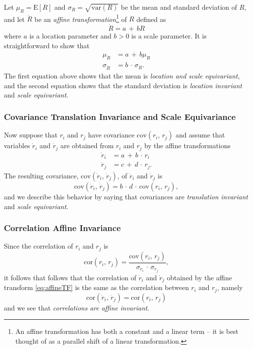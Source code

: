 \documentclass[graybox,envcountchap,sectrefs]{svmono}\usepackage[]{graphicx}\usepackage[]{xcolor}
\begin{document}
\begin{appendices}
Let $\mu_{R}=\mathrm{E\left[\mathit{R}\right]}$ and $\sigma_{R}=\sqrt{\mathrm{var}(R)}$
be the mean and standard deviation of $R$, and let $\dot{R}$ be
an \emph{affine transformation}\footnote{An affine transformation has both a constant and a linear term --
it is best thought of as a parallel shift of a linear transformation.} of $R$ defined as
\[
\dot{R}=a\,+\,bR
\]
where $a$ is a location parameter and $b>0$ is a scale parameter.
It is straightforward to show that
\begin{align*}
\mu_{\dot{R}} & =a\,+\,b\mu_{R}\\
\sigma_{\dot{R}} & =b\,\cdot\,\sigma_{R}.
\end{align*}
The first equation above shows that the mean is \emph{location and
scale equivariant}, and the second equation shows that the standard
deviation is \emph{location invariant} and \emph{scale equivariant}.

\subsubsection*{Covariance Translation Invariance and Scale Equivariance}

Now suppose that $r_{i}$ and $r_{j}$ have covariance $\mathrm{cov}(r_{i},\,r_{j})$
and assume that variables $\dot{r}_{i}$ and $\dot{r}_{j}$ are obtained
from $r_{i}$ and $r_{j}$ by the affine transformations
\begin{align}
\dot{r}_{i} & =a\,+\,b\,\cdot\,r_{i}\nonumber \\
\dot{r}_{j} & =c\,+\,d\,\cdot\,r_{j}.\label{eq:affineTF}
\end{align}
The resulting covariance, $\mathrm{cov}(\dot{r}_{i},\,\dot{r}_{j})$,
of $\dot{r}_{i}$ and $\dot{r}_{j}$ is
\begin{equation}
\mathrm{cov}(\dot{r}_{i},\,\dot{r}_{j})=b\,\cdot\,d\,\cdot\,\mathrm{cov}(r_{i},\,r_{j}),\label{eq:covAffineTF}
\end{equation}
and we describe this behavior by saying that covariances are \emph{translation
invariant} and \emph{scale equivariant}.

\subsubsection*{Correlation Affine Invariance}

Since the correlation of $r_{i}$ and $r_{j}$ is
\begin{equation}
\mathrm{cor}(r_{i},\,r_{j})=\frac{\mathrm{cov}(r_{i},\,r_{j})}{\sigma_{r_{i}}\,\cdot\,\sigma_{r_{j}}},
\end{equation}
it follows that follows that the correlation of $\dot{r}_{i}$ and
$\dot{r}_{j}$ obtained by the affine transform \eqref{eq:affineTF}
is the same as the correlation between $r_{i}$ and $r_{j}$, namely
\begin{equation}
\mathrm{cor}(\dot{r}_{i},\,\dot{r}_{j})=\mathrm{cor}(r_{i},\,r_{j})\label{eq:corrsAffineInvariance}
\end{equation}
and we see that \emph{correlations are affine invariant}.


\end{appendices}
\end{document}
